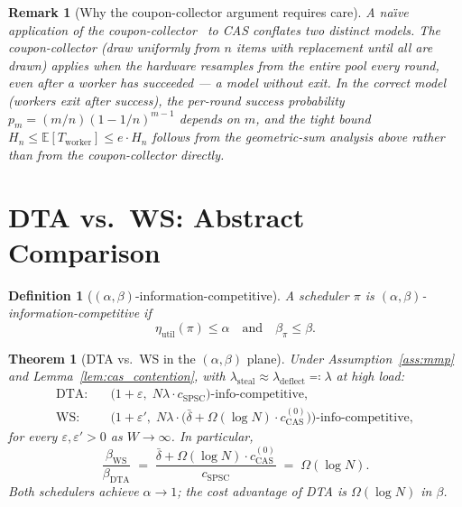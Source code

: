 \documentclass[11pt,a4paper]{report}
\newtheorem{theorem}{Theorem}[section]
\newtheorem{definition}{Definition}[section]
\newtheorem{remark}{Remark}[section]
\begin{document}
\begin{remark}[Why the coupon-collector argument requires care]
A na\"\i{}ve application of the coupon-collector~\cite{mitzenmacher2017} to CAS conflates two
distinct models.  The coupon-collector (draw uniformly from $n$ items
\emph{with replacement} until all are drawn) applies when the hardware
\emph{resamples} from the entire pool every round, even after a worker
has succeeded --- a model without exit.  In the correct model (workers
\emph{exit} after success), the per-round success probability
$p_m = (m/n)(1-1/n)^{m-1}$ depends on $m$, and the tight bound
$H_n \leq \mathbb{E}[T_{\mathrm{worker}}] \leq e\cdot H_n$ follows from
the geometric-sum analysis above rather than from the coupon-collector
directly.
\end{remark}

\section{DTA vs.\ WS: Abstract Comparison}
\label{sec:dta_ws_abstract}

\begin{definition}[$(\alpha,\beta)$-information-competitive]\label{def:alpha_beta}
A scheduler $\pi$ is \emph{$(\alpha,\beta)$-information-competitive} if
\[
  \eta_{\mathrm{util}}(\pi) \leq \alpha
  \quad\text{and}\quad
  \beta_\pi \leq \beta.
\]
\end{definition}

\begin{theorem}[DTA vs.\ WS in the $(\alpha,\beta)$ plane]
\label{thm:alpha_beta}
Under Assumption~\ref{ass:mmp} and Lemma~\ref{lem:cas_contention},
with $\lambda_{\mathrm{steal}} \approx \lambda_{\mathrm{deflect}} \eqqcolon \lambda$
at high load:
\begin{align}
  \text{DTA:}\quad &
    \bigl(1+\varepsilon,\;
      N\lambda\cdot c_{\mathrm{SPSC}}\bigr)\text{-info-competitive},
      \label{eq:dta_ab}\\[4pt]
  \text{WS:}\quad &
    \bigl(1+\varepsilon',\;
      N\lambda\cdot\bigl(\bar\delta + \Omega(\log N)\cdot c_{\mathrm{CAS}}^{(0)}\bigr)\bigr)
      \text{-info-competitive},
      \label{eq:ws_ab}
\end{align}
for every $\varepsilon, \varepsilon' > 0$ as $W \to \infty$.
In particular,
\begin{equation}\label{eq:beta_ratio}
  \frac{\beta_{\mathrm{WS}}}{\beta_{\mathrm{DTA}}}
  \;=\;
  \frac{\bar\delta + \Omega(\log N)\cdot c_{\mathrm{CAS}}^{(0)}}{c_{\mathrm{SPSC}}}
  \;=\; \Omega(\log N).
\end{equation}
Both schedulers achieve $\alpha \to 1$; the cost advantage of DTA
is $\Omega(\log N)$ in $\beta$.
\end{theorem}
\end{document}
